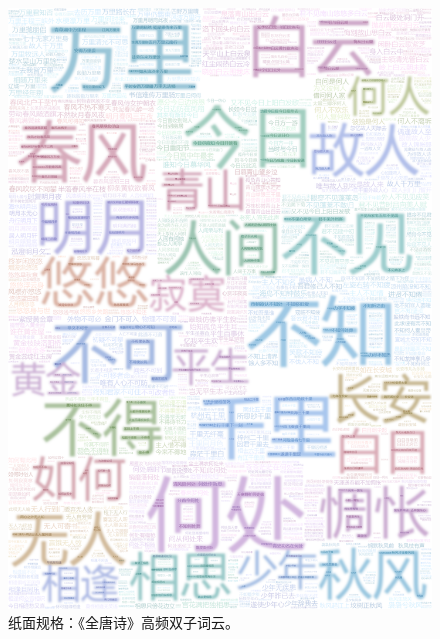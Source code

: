 \begin{figure}[htbp]
	\centering
	\includegraphics[width=\textwidth]{figures/tang.png}
	\caption{纸面规格：《全唐诗》高频双子词云。}
	\label{fig:tang_poet}
\end{figure}


